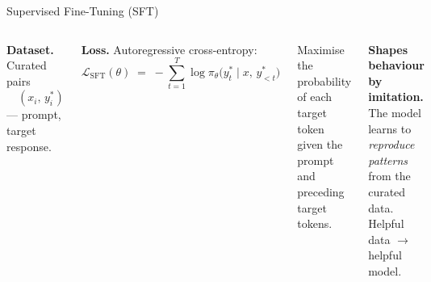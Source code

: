 \documentclass[aspectratio=169, 12pt, xcolor={dvipsnames,table}]{beamer}
\begin{document}
\begin{frame}{Supervised Fine-Tuning (SFT)}
  \begin{columns}[T]
    \textbf{Dataset.}\; Curated pairs\\
    $\quad (x_i,\, y^*_i)$ --- prompt, target response.
    \vspace{0.4em}

    \textbf{Loss.}\; Autoregressive cross-entropy:
    \begin{equation*}
      \mathcal{L}_{\text{SFT}}(\theta) \;=\;
      -\!\sum_{t=1}^{T}\! \log \pi_\theta\bigl(y^*_t \mid x,\, y^*_{<t}\bigr)
    \end{equation*}
    \vspace{-0.2em}

    {\small Maximise the probability of each target token given the
    prompt and preceding target tokens.}

    {\footnotesize\textbf{Shapes behaviour by imitation.}\\[4pt]
    The model learns to \emph{reproduce patterns} from the curated
    data. Helpful data $\to$ helpful model.}

    \vspace{0.8em}
  \end{columns}
\end{frame}
\end{document}
